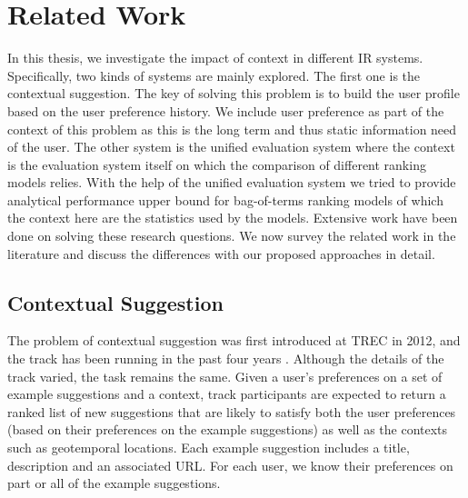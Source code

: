 %
%
\chapter{Related Work}

In this thesis, we investigate the impact of context in different IR systems. 
Specifically, two kinds of systems are mainly explored. 
The first one is the contextual suggestion. The key of solving this 
problem is to build the user profile based on the user preference history. 
We include user preference as part of the context of this problem as 
this is the long term and thus static information need of the user.
The other system is the unified evaluation system where the context is the 
evaluation system itself on which the comparison of different ranking models 
relies. With the help of the unified evaluation system we tried to 
provide analytical performance upper bound for bag-of-terms ranking models 
of which the context here are the statistics used by the models. 
Extensive work have been done on solving these research questions. 
We now survey the related work in the literature and discuss the differences
with our proposed approaches in detail.


\section{Contextual Suggestion}

The problem of contextual suggestion was first introduced at
TREC in 2012, and the track has been running in the past 
four years \cite{adriel:overview, adriel:overview2013, adriel:overview2014, 
adriel:overview2015}. 
Although the details of the track varied, the task remains 
the same.  Given a user's preferences on a set of example 
suggestions and a context, track participants
are expected to return a ranked list of new suggestions that 
are likely to satisfy both the user preferences (based on their preferences
on the example suggestions) as well as the contexts such as 
geotemporal locations. Each example suggestion includes a title, 
description and an associated URL. For each user, we know their 
preferences on part or all of the example suggestions. 

